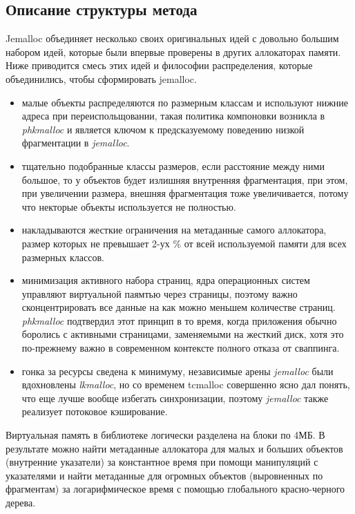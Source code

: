 \subsection{Описание структуры метода}
Jemalloc объединяет несколько своих оригинальных идей с довольно большим набором идей, которые были впервые проверены в других аллокаторах памяти. Ниже приводится смесь этих идей и философии распределения, которые объединились, чтобы сформировать jemalloc.
\begin{itemize}
	\item малые объекты распределяются по размерным классам и используют нижние адреса при переиспольщовании, такая политика компоновки возникла в \textit{phkmalloc} и является ключом к предсказуемому поведению низкой фрагментации в \textit{jemalloc}.
	\item тщательно подобранные классы размеров, если расстояние между ними большое, то у объектов будет излишняя внутренняя фрагментация, при этом, при увеличении размера, внешняя фрагментация тоже увеличивается, потому что некторые объекты используется не полностью.
	\item накладываются жесткие ограничения на метаданные самого аллокатора, размер которых не превышает 2-ух \% от всей используемой памяти для всех размерных классов.
	\item минимизация активного набора страниц, ядра операционных систем управляют виртуальной паямтью через страницы, поэтому важно сконцентрировать все данные на как можно меньшем количестве страниц. \textit{phkmalloc} подтвердил этот принцип в то время, когда приложения обычно боролись с активными страницами, заменяемыми на жесткий диск, хотя это по-прежнему важно в современном контексте полного отказа от сваппинга.
	\item гонка за ресурсы сведена к минимуму, независимые арены \textit{jemalloc} были вдохновлены \textit{lkmalloc}, но со временем tcmalloc совершенно ясно дал понять, что еще лучше вообще избегать синхронизации, поэтому \textit{jemalloc} также реализует потоковое кэширование.
\end{itemize}

Виртуальная память в библиотеке логически разделена на блоки по 4МБ. В результате можно найти метаданные аллокатора для малых и больших объектов (внутренние указатели) за константное время при помощи манипуляций с указателями и найти метаданные для огромных объектов (выровненных по фрагментам) за логарифмическое время с помощью глобального красно-черного дерева.

